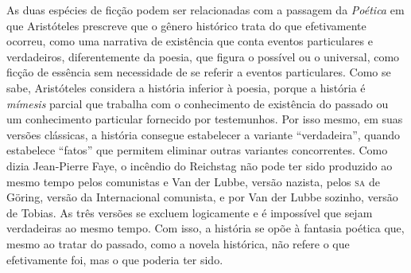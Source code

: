 As duas espécies de ficção podem ser relacionadas com a passagem da
\emph{Poética} em que Aristóteles prescreve que o gênero histórico trata
do que efetivamente ocorreu, como uma narrativa de existência que conta
eventos particulares e verdadeiros, diferentemente da poesia, que figura
o possível ou o universal, como ficção de essência sem necessidade de se
referir a eventos particulares. Como se sabe, Aristóteles considera a
história inferior à poesia, porque a história é \emph{mímesis} parcial
que trabalha com o conhecimento de existência do passado ou um
conhecimento particular fornecido por testemunhos. Por isso mesmo, em
suas versões clássicas, a história consegue estabelecer a variante
``verdadeira'', quando estabelece ``fatos'' que permitem eliminar outras
variantes concorrentes. Como dizia Jean-Pierre Faye, o incêndio do
Reichstag não pode ter sido produzido ao mesmo tempo pelos comunistas e
Van der Lubbe, versão nazista, pelos \textsc{sa} de Göring, versão da
Internacional comunista, e por Van der Lubbe sozinho, versão de Tobias.
As três versões se excluem logicamente e é impossível que sejam
verdadeiras ao mesmo tempo. Com isso, a história se opõe à fantasia
poética que, mesmo ao tratar do passado, como a novela histórica, não
refere o que efetivamente foi, mas o que poderia ter sido.

